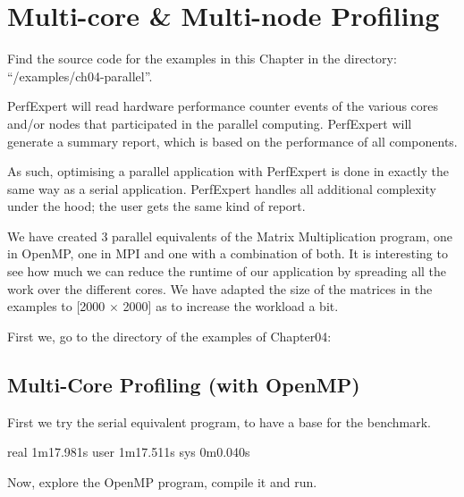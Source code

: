 \chapter{Multi-core \& Multi-node Profiling}
\label{ch:ch04_multi_core_multi_node_profiling}

\renewcommand{\exampledir}{examples/ch04-parallel}

\begin{tip}
Find the source code for the examples in this Chapter in the directory:  ``\tilde/\exampledir''.
\end{tip}

PerfExpert will read hardware performance counter events of the various cores and/or nodes that participated in the parallel computing. PerfExpert will generate a summary report, which is based on the performance of all components.

As such, optimising a parallel application with PerfExpert is done in exactly the same way as a serial application. PerfExpert handles all additional complexity under the hood; the user gets the same kind of report.

We have created 3 parallel equivalents of the Matrix Multiplication program, one in OpenMP, one in MPI and one with a combination of both. It is interesting to see how much we can reduce the runtime of our application by spreading all the work over the different cores. We have adapted the size of the matrices in the examples to [2000 $\times$ 2000] as to increase the workload a bit.

First we, go to the directory of the examples of Chapter04:

\begin{prompt}
\end{prompt}

\section{Multi-Core Profiling (with OpenMP)}
\label{sec:Multi_core_profilingi_OpenMP}

First we try the serial equivalent program, to have a base for the benchmark.

\begin{prompt}
real 1m17.981s
user 1m17.511s
sys 0m0.040s
\end{prompt}

Now, explore the OpenMP program, compile it and run.

